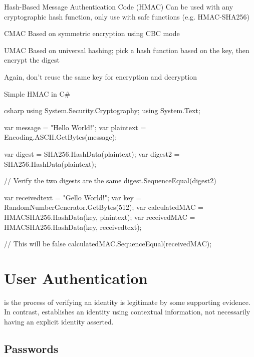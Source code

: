\documentclass[code]{amznotes}
\begin{document}
\begin{dfnbox}{Hash-Based Message Authentication Code (HMAC)}{}
    Can be used with any cryptographic hash function, only use with safe functions (e.g. HMAC-SHA256)
\end{dfnbox}

\begin{dfnbox}{CMAC}{}
    Based on symmetric encryption using CBC mode
\end{dfnbox}


\begin{dfnbox}{UMAC}{}
    Based on universal hashing; pick a hash function based on the key, then encrypt the digest
\end{dfnbox}

Again, don't reuse the same key for encryption and decryption

\begin{codebox}{Simple HMAC in C\#}{}{}
    \begin{amzcode}{csharp}
using System.Security.Cryptography;
using System.Text;

var message = "Hello World!";
var plaintext = Encoding.ASCII.GetBytes(message);

var digest = SHA256.HashData(plaintext);
var digest2 = SHA256.HashData(plaintext);

// Verify the two digests are the same
digest.SequenceEqual(digest2)

var receivedtext = "Gello World!";
var key = RandomNumberGenerator.GetBytes(512);
var calculatedMAC = HMACSHA256.HashData(key, plaintext);
var receivedMAC = HMACSHA256.HashData(key, receivedtext);

// This will be false
calculatedMAC.SequenceEqual(receivedMAC);
    \end{amzcode}
\end{codebox}

\chapter{User Authentication}

 is the process of verifying an identity is legitimate by some supporting evidence. In contrast,  establishes an identity using contextual information, not necessarily having an explicit identity asserted.

\section{Passwords}
\end{document}

